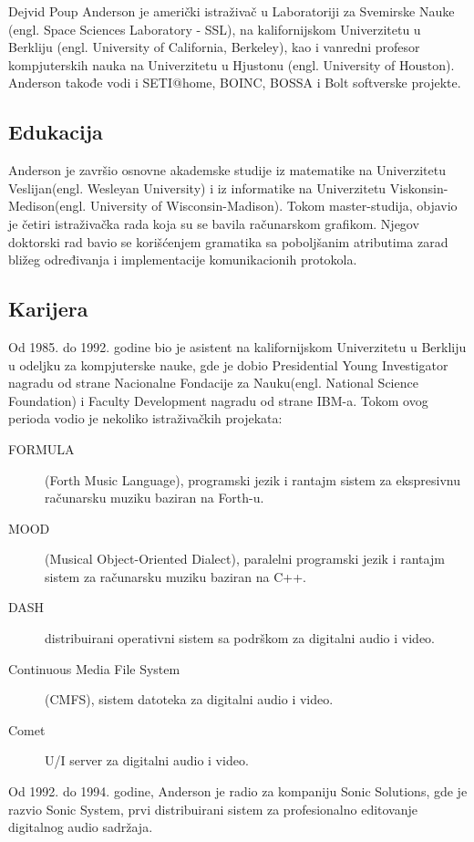 \documentclass[titlepage, 12pt]{article}
\begin{document}
Dejvid Poup Anderson je američki istraživač u Laboratoriji za Svemirske Nauke (engl. Space Sciences Laboratory - SSL), na kalifornijskom Univerzitetu u Berkliju (engl. University of California, Berkeley), kao i vanredni profesor kompjuterskih nauka na Univerzitetu u Hjustonu (engl. University of Houston). Anderson takođe vodi i SETI@home, BOINC, BOSSA i Bolt softverske projekte.
\subsection{Edukacija}
Anderson je završio osnovne akademske studije iz matematike na Univerzitetu Veslijan(engl. Wesleyan University) i iz informatike na Univerzitetu Viskonsin-Medison(engl. University of Wisconsin-Madison). Tokom master-studija, objavio je četiri istraživačka rada koja su se bavila računarskom grafikom. Njegov doktorski rad bavio se korišćenjem gramatika sa poboljšanim atributima zarad bližeg određivanja i implementacije komunikacionih protokola.

\subsection{Karijera}
Od 1985. do 1992. godine bio je asistent na kalifornijskom Univerzitetu u Berkliju u odeljku za kompjuterske nauke, gde je dobio Presidential Young Investigator nagradu od strane Nacionalne Fondacije za Nauku(engl. National Science Foundation) i Faculty Development nagradu od strane IBM-a. Tokom ovog perioda vodio je nekoliko istraživačkih projekata:
\begin{description}
	\item[FORMULA] (Forth Music Language), programski jezik i rantajm sistem za ekspresivnu računarsku muziku baziran na Forth-u.
	\item[MOOD] (Musical Object-Oriented Dialect), paralelni programski jezik i rantajm sistem za računarsku muziku baziran na C++.
	
	\item[DASH] distribuirani operativni sistem sa podrškom za digitalni audio i video.
	
	\item[Continuous Media File System] (CMFS), sistem datoteka za digitalni audio i video.
	
	\item[Comet] U/I server za digitalni audio i video.
	
\end{description}
Od 1992. do 1994. godine, Anderson je radio za kompaniju Sonic Solutions, gde je razvio Sonic System, prvi distribuirani sistem za profesionalno editovanje digitalnog audio sadržaja.
\end{document}
